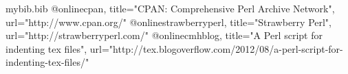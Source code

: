 \begin{filecontents}{mybib.bib}
	@online{cpan,
		title="CPAN: Comprehensive Perl Archive Network",
		url="http://www.cpan.org/"}
	@online{strawberryperl,
		title="Strawberry Perl",
		url="http://strawberryperl.com/"}
	@online{cmhblog,
		title="A Perl script for indenting tex files",
		url="http://tex.blogoverflow.com/2012/08/a-perl-script-for-indenting-tex-files/"}
\end{filecontents}
\documentclass[11pt]{article}
%   
%   
\usepackage[left=4.5cm,right=2.5cm,showframe=false,
top=2cm,bottom=1.5cm]{geometry}               
\usepackage{parskip}
\usepackage{booktabs}
\usepackage{listings}
\usepackage{titlesec}
\usepackage{changepage}
\usepackage{xcolor}
\usepackage{fancyhdr}
\usepackage[sc]{caption}
\usepackage[backend=bibtex]{biblatex}
\usepackage{mdframed}
\usepackage{enumitem}
\usepackage{varioref}
\usepackage[colorlinks=true,linkcolor=blue,citecolor=black]{hyperref}
\usepackage{cleveref}




